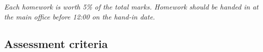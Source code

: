\bit
\it Each homework is worth 5\% of the total marks.
\it Homework should be handed in at the main office before 12:00 on the hand-in date.
\eit

\subsection*{Assessment criteria}



\endinput
